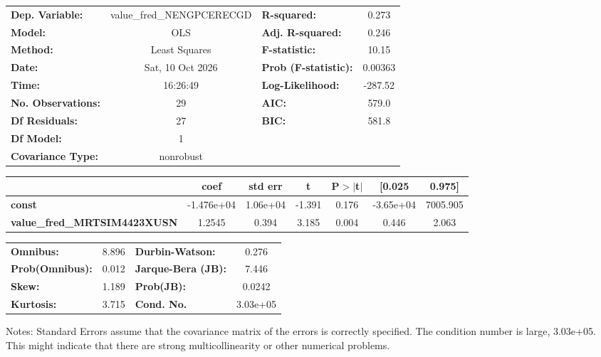 \begin{center}
\begin{tabular}{lclc}
\toprule
\textbf{Dep. Variable:}              & value\_fred\_NENGPCERECGD & \textbf{  R-squared:         } &     0.273   \\
\textbf{Model:}                      &            OLS            & \textbf{  Adj. R-squared:    } &     0.246   \\
\textbf{Method:}                     &       Least Squares       & \textbf{  F-statistic:       } &     10.15   \\
\textbf{Date:}                       &      Sat, 10 Oct 2026     & \textbf{  Prob (F-statistic):} &  0.00363    \\
\textbf{Time:}                       &          16:26:49         & \textbf{  Log-Likelihood:    } &   -287.52   \\
\textbf{No. Observations:}           &               29          & \textbf{  AIC:               } &     579.0   \\
\textbf{Df Residuals:}               &               27          & \textbf{  BIC:               } &     581.8   \\
\textbf{Df Model:}                   &                1          & \textbf{                     } &             \\
\textbf{Covariance Type:}            &         nonrobust         & \textbf{                     } &             \\
\bottomrule
\end{tabular}
\begin{tabular}{lcccccc}
                                     & \textbf{coef} & \textbf{std err} & \textbf{t} & \textbf{P$> |$t$|$} & \textbf{[0.025} & \textbf{0.975]}  \\
\midrule
\textbf{const}                       &   -1.476e+04  &     1.06e+04     &    -1.391  &         0.176        &    -3.65e+04    &     7005.905     \\
\textbf{value\_fred\_MRTSIM4423XUSN} &       1.2545  &        0.394     &     3.185  &         0.004        &        0.446    &        2.063     \\
\bottomrule
\end{tabular}
\begin{tabular}{lclc}
\textbf{Omnibus:}       &  8.896 & \textbf{  Durbin-Watson:     } &    0.276  \\
\textbf{Prob(Omnibus):} &  0.012 & \textbf{  Jarque-Bera (JB):  } &    7.446  \\
\textbf{Skew:}          &  1.189 & \textbf{  Prob(JB):          } &   0.0242  \\
\textbf{Kurtosis:}      &  3.715 & \textbf{  Cond. No.          } & 3.03e+05  \\
\bottomrule
\end{tabular}
\end{center}

Notes: \newline
 [1] Standard Errors assume that the covariance matrix of the errors is correctly specified. \newline
 [2] The condition number is large, 3.03e+05. This might indicate that there are \newline
 strong multicollinearity or other numerical problems.
